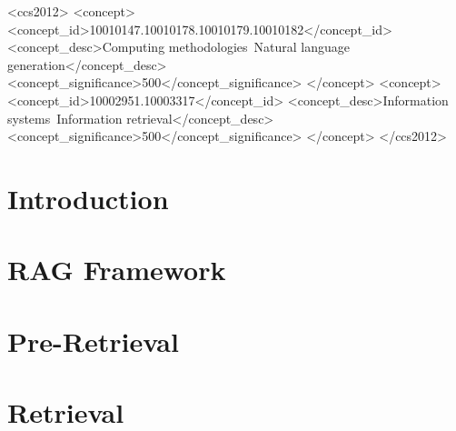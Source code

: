 \documentclass[acmsmall, table]{acmart}
\begin{document}
\begin{CCSXML}
	<ccs2012>
	<concept>
	<concept_id>10010147.10010178.10010179.10010182</concept_id>
	<concept_desc>Computing methodologies~Natural language generation</concept_desc>
	<concept_significance>500</concept_significance>
	</concept>
	<concept>
	<concept_id>10002951.10003317</concept_id>
	<concept_desc>Information systems~Information retrieval</concept_desc>
	<concept_significance>500</concept_significance>
	</concept>
	</ccs2012>
\end{CCSXML}




\maketitle

\section{Introduction}
\label{sec:intro}


\section{RAG Framework}
\label{sec:framework}


\section{Pre-Retrieval}
\label{sec:preretrieval}


\section{Retrieval}
\label{sec:retrieval}

\end{document}
